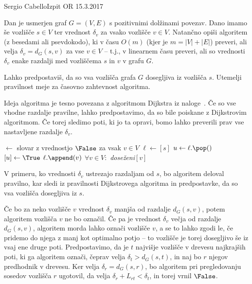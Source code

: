 \begin{naloga}{Sergio Cabello}{Izpit OR 15.3.2017}
\begin{vprasanje}
Dan je usmerjen graf $G = (V, E)$ s pozitivnimi dolžinami povezav.
Dano imamo še vozlišče $s \in V$
ter vrednost $\delta_v$ za vsako vozlišče $v \in V$.
Natančno opiši algoritem (z besedami ali psevdokodo),
ki v času $O(m)$ (kjer je $m = |V| + |E|$) preveri,
ali velja $\delta_v = d_G(s, v)$ za vse $v \in V$
-- t.j., v linearnem času preveri,
ali so vrednosti $\delta_v$
enake razdalji med vozliščema $s$ in $v$ v grafu $G$.

Lahko predpostaviš, da so vsa vozlišča grafa $G$ dosegljiva iz vozlišča $s$.
Utemelji pravilnost meje za časovno zahtevnost algoritma.
\end{vprasanje}

\begin{odgovor}
Ideja algoritma je tesno povezana z algoritmom {\sc Dijkstra}
iz naloge~\res[dijkstra].
Če so vse vhodne razdalje pravilne,
lahko predpostavimo, da so bile poiskane z Dijkstrovim algoritmom.
Če torej sledimo poti, ki jo ta opravi,
bomo lahko preverili prav vse nastavljene razdalje $\delta_v$.
\begin{small}
\begin{algorithmic}
		\State \Return \False
	\EndIf
     $\gets$ slovar z vrednostjo $\False$
                                  za vsak $v \in V$
	\State $\ell \gets [s]$
		\State $u \gets \ell.\pop()$
		$[u] \gets \True$
					\State $\ell.\append(v)$
				\EndIf
				\State \Return \False
			\EndIf
		\EndFor
	\EndWhile
	\State \Return $\forall v \in V :$ {\sl doseženi}$[v]$
\EndFunction
\end{algorithmic}
\end{small}

V primeru, ko vrednosti $\delta_v$ ustrezajo razdaljam od $s$,
bo algoritem deloval pravilno,
kar sledi iz pravilnosti Dijkstrovega algoritma in predpostavke,
da so vsa vozlišča dosegljiva iz $s$.

Če bo za neko vozlišče $v$ vrednost $\delta_v$ manjša od razdalje $d_G(s, v)$,
potem algoritem vozlišča $v$ ne bo označil.
Če pa je vrednost $\delta_v$ večja od razdalje $d_G(s, v)$,
algoritem morda lahko označi vozlišče $v$,
a se to lahko zgodi le, če pridemo do njega z manj kot optimalno potjo
-- to vozlišče je torej dosegljivo še iz vsaj ene druge poti.
Predpostavimo, da je $t$ najvišje vozlišče v drevesu najkrajših poti,
ki ga algoritem označi, čeprav velja $\delta_t > d_G(s, t)$,
in naj bo $r$ njegov predhodnik v drevesu.
Ker velja $\delta_r = d_G(s, r)$,
bo algoritem pri pregledovanju sosedov vozlišča $r$ ugotovil,
da velja $\delta_r + L_{rt} < \delta_t$, in torej vrnil $\False$.


\end{odgovor}
\end{naloga}

